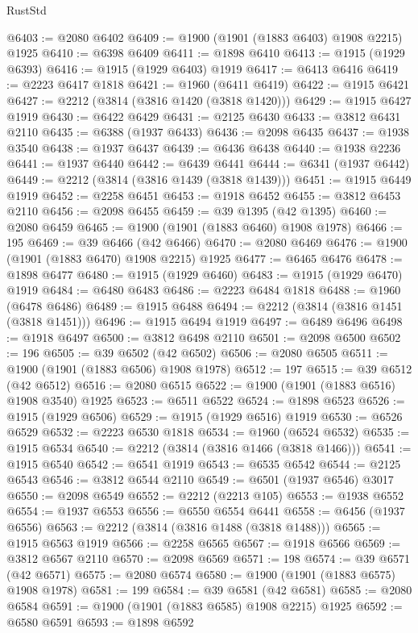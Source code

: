 \begin{lexlean}{RustStd}
\begin{coremodule}
{\begin{coremodule}
{{{{{{{{{{{{{{{{{{{{{{{{{{{{{{{{{{{{{{{{{{{@6403 := @2080 @6402
@6409 := @1900 (@1901 (@1883 @6403) @1908 @2215) @1925
@6410 := @6398 @6409
@6411 := @1898 @6410
@6413 := @1915 (@1929 @6393)
@6416 := @1915 (@1929 @6403) @1919
@6417 := @6413 @6416
@6419 := @2223 @6417 @1818
@6421 := @1960 (@6411 @6419)
@6422 := @1915 @6421
@6427 := @2212 (@3814 (@3816 @1420 (@3818 @1420)))
@6429 := @1915 @6427 @1919
@6430 := @6422 @6429
@6431 := @2125 @6430
@6433 := @3812 @6431 @2110
@6435 := @6388 (@1937 @6433)
@6436 := @2098 @6435
@6437 := @1938 @3540
@6438 := @1937 @6437
@6439 := @6436 @6438
@6440 := @1938 @2236
@6441 := @1937 @6440
@6442 := @6439 @6441
@6444 := @6341 (@1937 @6442)
@6449 := @2212 (@3814 (@3816 @1439 (@3818 @1439)))
@6451 := @1915 @6449 @1919
@6452 := @2258 @6451
@6453 := @1918 @6452
@6455 := @3812 @6453 @2110
@6456 := @2098 @6455
@6459 := @39 @1395 (@42 @1395)
@6460 := @2080 @6459
@6465 := @1900 (@1901 (@1883 @6460) @1908 @1978)
@6466 := 195
@6469 := @39 @6466 (@42 @6466)
@6470 := @2080 @6469
@6476 := @1900 (@1901 (@1883 @6470) @1908 @2215) @1925
@6477 := @6465 @6476
@6478 := @1898 @6477
@6480 := @1915 (@1929 @6460)
@6483 := @1915 (@1929 @6470) @1919
@6484 := @6480 @6483
@6486 := @2223 @6484 @1818
@6488 := @1960 (@6478 @6486)
@6489 := @1915 @6488
@6494 := @2212 (@3814 (@3816 @1451 (@3818 @1451)))
@6496 := @1915 @6494 @1919
@6497 := @6489 @6496
@6498 := @1918 @6497
@6500 := @3812 @6498 @2110
@6501 := @2098 @6500
@6502 := 196
@6505 := @39 @6502 (@42 @6502)
@6506 := @2080 @6505
@6511 := @1900 (@1901 (@1883 @6506) @1908 @1978)
@6512 := 197
@6515 := @39 @6512 (@42 @6512)
@6516 := @2080 @6515
@6522 := @1900 (@1901 (@1883 @6516) @1908 @3540) @1925
@6523 := @6511 @6522
@6524 := @1898 @6523
@6526 := @1915 (@1929 @6506)
@6529 := @1915 (@1929 @6516) @1919
@6530 := @6526 @6529
@6532 := @2223 @6530 @1818
@6534 := @1960 (@6524 @6532)
@6535 := @1915 @6534
@6540 := @2212 (@3814 (@3816 @1466 (@3818 @1466)))
@6541 := @1915 @6540
@6542 := @6541 @1919
@6543 := @6535 @6542
@6544 := @2125 @6543
@6546 := @3812 @6544 @2110
@6549 := @6501 (@1937 @6546) @3017
@6550 := @2098 @6549
@6552 := @2212 (@2213 @105)
@6553 := @1938 @6552
@6554 := @1937 @6553
@6556 := @6550 @6554 @6441
@6558 := @6456 (@1937 @6556)
@6563 := @2212 (@3814 (@3816 @1488 (@3818 @1488)))
@6565 := @1915 @6563 @1919
@6566 := @2258 @6565
@6567 := @1918 @6566
@6569 := @3812 @6567 @2110
@6570 := @2098 @6569
@6571 := 198
@6574 := @39 @6571 (@42 @6571)
@6575 := @2080 @6574
@6580 := @1900 (@1901 (@1883 @6575) @1908 @1978)
@6581 := 199
@6584 := @39 @6581 (@42 @6581)
@6585 := @2080 @6584
@6591 := @1900 (@1901 (@1883 @6585) @1908 @2215) @1925
@6592 := @6580 @6591
@6593 := @1898 @6592
}}}}}}}}}}}}}}}}}}}}}}}}}}}}}}}}}}}}}}}}}}}
\end{coremodule}}
\end{coremodule}
\end{lexlean}
